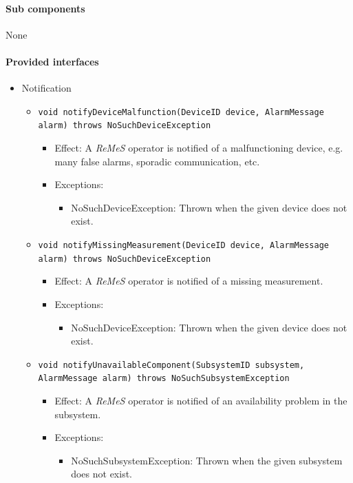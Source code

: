 \documentclass[a4paper,10pt]{article}
\newcommand{\rem}{\emph{ReMeS}\xspace}
\begin{document}
\paragraph{Sub components} None

\paragraph{Provided interfaces}
\begin{itemize}
    \item Notification
    \begin{itemize}
    	\item \texttt{void notifyDeviceMalfunction(DeviceID device, AlarmMessage alarm) throws NoSuchDeviceException}
        \begin{itemize}
            \item Effect: A \rem operator is notified of a malfunctioning device, e.g. many false alarms, sporadic communication, etc.
            \item Exceptions:
            \begin{itemize}
                \item NoSuchDeviceException: Thrown when the given device does not exist.
            \end{itemize}
		\end{itemize}
        
        \item \texttt{void notifyMissingMeasurement(DeviceID device, AlarmMessage alarm) throws NoSuchDeviceException}
        \begin{itemize}
            \item Effect: A \rem operator is notified of a missing measurement.
            \item Exceptions:
            \begin{itemize}
                \item NoSuchDeviceException: Thrown when the given device does not exist.
            \end{itemize}
		\end{itemize}
        
        \item \texttt{void notifyUnavailableComponent(SubsystemID subsystem, AlarmMessage alarm) throws NoSuchSubsystemException}
        \begin{itemize}
            \item Effect: A \rem operator is notified of an availability problem in the subsystem.
            \item Exceptions:
            \begin{itemize}
                \item NoSuchSubsystemException: Thrown when the given subsystem does not exist.
            \end{itemize}
		\end{itemize}
        

\end{itemize}
\end{itemize}
\end{document}
